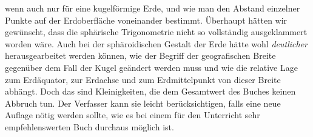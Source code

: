 %
wenn auch nur für eine kugelförmige Erde, und wie man den Abstand einzelner Punkte auf der Erdoberfläche voneinander bestimmt. Überhaupt hätten wir gewünscht, dass die sphärische Trigonometrie nicht so vollständig ausgeklammert worden wäre. Auch bei der sphäroidischen Gestalt der Erde hätte wohl \textit{deutlicher} herausgearbeitet werden können, wie der Begriff der geografischen Breite gegenüber dem Fall der Kugel geändert werden muss und wie die relative Lage zum Erdäquator, zur Erdachse und zum Erdmittelpunkt von dieser Breite abhängt. Doch das sind Kleinigkeiten, die dem Gesamtwert des Buches keinen Abbruch tun. Der Verfasser kann sie leicht berücksichtigen, falls eine neue Auflage nötig werden sollte, wie es bei einem für den Unterricht sehr empfehlenswerten Buch durchaus möglich ist.

